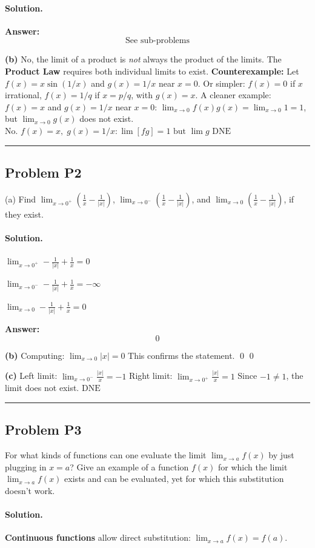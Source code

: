\documentclass[12pt, a4paper]{article}
\newcommand{\problem}[1]{\subsection*{Problem #1}}
\newcommand{\solution}{\paragraph{Solution.}}
\begin{document}
\solution

\textbf{Answer:}
\[\boxed{\text{See sub-problems}}\]

\textbf{(b)}
No, the limit of a product is \emph{not} always the product of the limits.
The \textbf{Product Law} requires both individual limits to exist.
\textbf{Counterexample:} Let $f(x) = x \sin(1/x)$ and $g(x) = 1/x$ near $x=0$. Or simpler: $f(x) = 0$ if $x$ irrational, $f(x) = 1/q$ if $x = p/q$, with $g(x) = x$.
A cleaner example: $f(x) = x$ and $g(x) = 1/x$ near $x=0$: $\lim_{x \to 0} f(x)g(x) = \lim_{x \to 0} 1 = 1$, but $\lim_{x \to 0} g(x)$ does not exist.
$\boxed{\text{No. } f(x)=x,\; g(x)=1/x: \lim[fg]=1 \text{ but } \lim g \text{ DNE}}$

\vspace{1em}
\hrule
\vspace{1em}

\problem{P2}

(a) Find $\lim_{x \to 0^+}(\frac{1}{x} - \frac{1}{|x|})$, $\lim_{x \to 0^-}(\frac{1}{x} - \frac{1}{|x|})$, and $\lim_{x \to 0}(\frac{1}{x} - \frac{1}{|x|})$, if they exist.

\solution

$\lim_{x \to 0^+} - \frac{1}{\left|{x}\right|} + \frac{1}{x} = 0$

$\lim_{x \to 0^-} - \frac{1}{\left|{x}\right|} + \frac{1}{x} = -\infty$

$\lim_{x \to 0} - \frac{1}{\left|{x}\right|} + \frac{1}{x} = 0$

\textbf{Answer:}
\[\boxed{0}\]

\textbf{(b)}
Computing: $\lim_{x \to 0} \left|{x}\right| = 0$
This confirms the statement. \qed
$\boxed{0}$

\textbf{(c)}
Left limit: $\lim_{x \to 0^-} \frac{\left|{x}\right|}{x} = -1$
Right limit: $\lim_{x \to 0^+} \frac{\left|{x}\right|}{x} = 1$
Since $-1 \neq 1$, the limit does not exist.
$\boxed{\text{DNE}}$

\vspace{1em}
\hrule
\vspace{1em}

\problem{P3}

For what kinds of functions can one evaluate the limit $\lim_{x \to a} f(x)$ by just plugging in $x = a$? Give an example of a function $f(x)$ for which the limit $\lim_{x \to a} f(x)$ exists and can be evaluated, yet for which this substitution doesn't work.

\solution

\textbf{Continuous functions} allow direct substitution: $\lim_{x \to a} f(x) = f(a)$.
\end{document}
